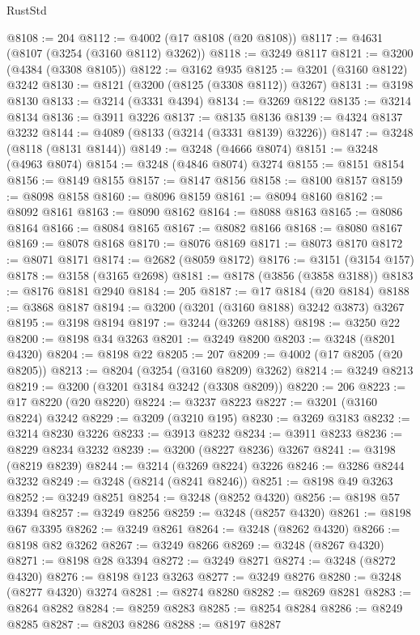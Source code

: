 \begin{lexlean}{RustStd}
\begin{coremodule}
@8108 := 204
@8112 := @4002 (@17 @8108 (@20 @8108))
@8117 := @4631 (@8107 (@3254 (@3160 @8112) @3262))
@8118 := @3249 @8117
@8121 := @3200 (@4384 (@3308 @8105))
@8122 := @3162 @935
@8125 := @3201 (@3160 @8122) @3242
@8130 := @8121 (@3200 (@8125 (@3308 @8112)) @3267)
@8131 := @3198 @8130
@8133 := @3214 (@3331 @4394)
@8134 := @3269 @8122
@8135 := @3214 @8134
@8136 := @3911 @3226
@8137 := @8135 @8136
@8139 := @4324 @8137 @3232
@8144 := @4089 (@8133 (@3214 (@3331 @8139) @3226))
@8147 := @3248 (@8118 (@8131 @8144))
@8149 := @3248 (@4666 @8074)
@8151 := @3248 (@4963 @8074)
@8154 := @3248 (@4846 @8074) @3274
@8155 := @8151 @8154
@8156 := @8149 @8155
@8157 := @8147 @8156
@8158 := @8100 @8157
@8159 := @8098 @8158
@8160 := @8096 @8159
@8161 := @8094 @8160
@8162 := @8092 @8161
@8163 := @8090 @8162
@8164 := @8088 @8163
@8165 := @8086 @8164
@8166 := @8084 @8165
@8167 := @8082 @8166
@8168 := @8080 @8167
@8169 := @8078 @8168
@8170 := @8076 @8169
@8171 := @8073 @8170
@8172 := @8071 @8171
@8174 := @2682 (@8059 @8172)
@8176 := @3151 (@3154 @157)
@8178 := @3158 (@3165 @2698)
@8181 := @8178 (@3856 (@3858 @3188))
@8183 := @8176 @8181 @2940
@8184 := 205
@8187 := @17 @8184 (@20 @8184)
@8188 := @3868 @8187
@8194 := @3200 (@3201 (@3160 @8188) @3242 @3873) @3267
@8195 := @3198 @8194
@8197 := @3244 (@3269 @8188)
@8198 := @3250 @22
@8200 := @8198 @34 @3263
@8201 := @3249 @8200
@8203 := @3248 (@8201 @4320)
@8204 := @8198 @22
@8205 := 207
@8209 := @4002 (@17 @8205 (@20 @8205))
@8213 := @8204 (@3254 (@3160 @8209) @3262)
@8214 := @3249 @8213
@8219 := @3200 (@3201 @3184 @3242 (@3308 @8209))
@8220 := 206
@8223 := @17 @8220 (@20 @8220)
@8224 := @3237 @8223
@8227 := @3201 (@3160 @8224) @3242
@8229 := @3209 (@3210 @195)
@8230 := @3269 @3183
@8232 := @3214 @8230 @3226
@8233 := @3913 @8232
@8234 := @3911 @8233
@8236 := @8229 @8234 @3232
@8239 := @3200 (@8227 @8236) @3267
@8241 := @3198 (@8219 @8239)
@8244 := @3214 (@3269 @8224) @3226
@8246 := @3286 @8244 @3232
@8249 := @3248 (@8214 (@8241 @8246))
@8251 := @8198 @49 @3263
@8252 := @3249 @8251
@8254 := @3248 (@8252 @4320)
@8256 := @8198 @57 @3394
@8257 := @3249 @8256
@8259 := @3248 (@8257 @4320)
@8261 := @8198 @67 @3395
@8262 := @3249 @8261
@8264 := @3248 (@8262 @4320)
@8266 := @8198 @82 @3262
@8267 := @3249 @8266
@8269 := @3248 (@8267 @4320)
@8271 := @8198 @28 @3394
@8272 := @3249 @8271
@8274 := @3248 (@8272 @4320)
@8276 := @8198 @123 @3263
@8277 := @3249 @8276
@8280 := @3248 (@8277 @4320) @3274
@8281 := @8274 @8280
@8282 := @8269 @8281
@8283 := @8264 @8282
@8284 := @8259 @8283
@8285 := @8254 @8284
@8286 := @8249 @8285
@8287 := @8203 @8286
@8288 := @8197 @8287

\end{coremodule}
\end{lexlean}

